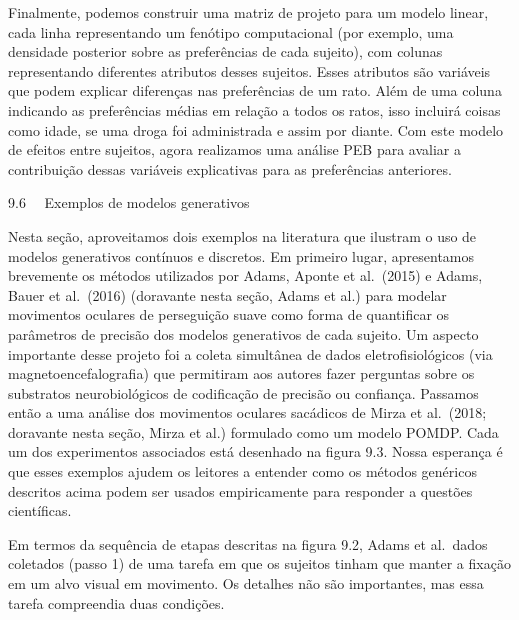 \documentclass[
  12pt,
]{book}
\begin{document}
Finalmente, podemos construir uma matriz de projeto para um modelo linear, cada linha representando um fenótipo computacional (por exemplo, uma densidade posterior sobre as preferências de cada sujeito), com colunas representando diferentes atributos desses sujeitos. Esses atributos são variáveis que podem explicar diferenças nas preferências de um rato. Além de uma coluna indicando as preferências médias em relação a todos os ratos, isso incluirá coisas como idade, se uma droga foi administrada e assim por diante. Com este modelo de efeitos entre sujeitos, agora realizamos uma análise PEB para avaliar a contribuição dessas variáveis explicativas para as preferências anteriores.

9.6  Exemplos de modelos generativos

Nesta seção, aproveitamos dois exemplos na literatura que ilustram o uso de modelos generativos contínuos e discretos. Em primeiro lugar, apresentamos brevemente os métodos utilizados por Adams, Aponte et al.~(2015) e Adams, Bauer et al.~(2016) (doravante nesta seção, Adams et al.) para modelar movimentos oculares de perseguição suave como forma de quantificar os parâmetros de precisão dos modelos generativos de cada sujeito. Um aspecto importante desse projeto foi a coleta simultânea de dados eletrofisiológicos (via magnetoencefalografia) que permitiram aos autores fazer perguntas sobre os substratos neurobiológicos de codificação de precisão ou confiança. Passamos então a uma análise dos movimentos oculares sacádicos de Mirza et al.~(2018; doravante nesta seção, Mirza et al.) formulado como um modelo POMDP. Cada um dos experimentos associados está desenhado na figura 9.3. Nossa esperança é que esses exemplos ajudem os leitores a entender como os métodos genéricos descritos acima podem ser usados \hspace{0pt}\hspace{0pt}empiricamente para responder a questões científicas.

Em termos da sequência de etapas descritas na figura 9.2, Adams et al.~dados coletados (passo 1) de uma tarefa em que os sujeitos tinham que manter a fixação em um alvo visual em movimento. Os detalhes não são importantes, mas essa tarefa compreendia duas condições.
\end{document}

